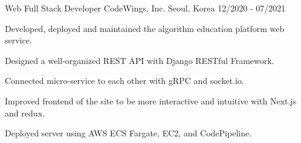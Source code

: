 \cventry
{Web Full Stack Developer} %
{CodeWings, Inc.} %
{Seoul, Korea} %
{12/2020 - 07/2021} %
\begin{cvitems}
\item {Developed, deployed and maintained the algorithm education platform web service.}
\item {Designed a well-organized REST API with Django RESTful Framework.}
\item {Connected micro-service to each other with gRPC and socket.io.}
\item {Improved frontend of the site to be more interactive and intuitive with Next.js and redux.}
\item {Deployed server using AWS ECS Fargate, EC2, and CodePipeline.}
\end{cvitems}
